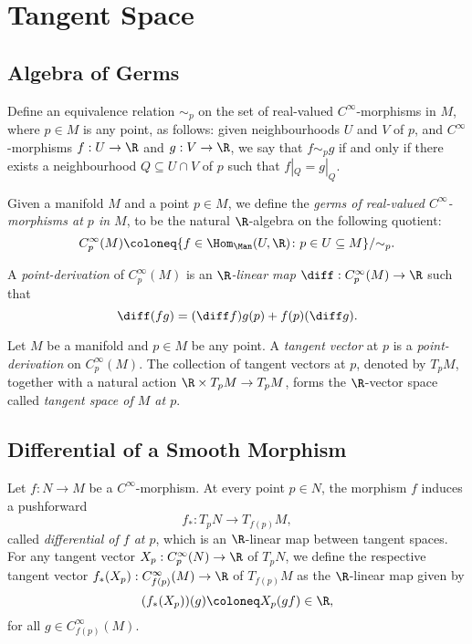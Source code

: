 \section{Tangent Space}

\subsection{Algebra of Germs}

Define an equivalence relation \(\sim_p\) on the set of real-valued
\(C^{\infty}\)-morphisms in \(M\), where \(p \in M\) is any point, as follows:
given neighbourhoods \(U\) and \(V\) of \(p\), and \(C^{\infty}\)-morphisms
\(f: U \to \R\) and \(g: V \to \R\), we say that \(f \sim_p g\) if and only if
there exists a neighbourhood \(Q \subseteq U \cap V\) of \(p\) such that
\(f|_Q = g|_Q\).

\begin{definition}
\label{def:algebra-of-germs-manifold}
Given a manifold \(M\) and a point \(p \in M\), we define the \emph{germs of
  real-valued \(C^{\infty}\)-morphisms at \(p\) in \(M\)}, to be the natural
\(\R\)-algebra on the following quotient:
\[
C_p^{\infty}(M) \coloneq
\{f \in \Hom_{\Man}(U, \R) \colon p \in U \subseteq M\}/{\sim_p}.
\]

A \emph{point-derivation} of \(C_p^{\infty}(M)\) is an \emph{\(\R\)-linear map}
\(\diff: C_p^{\infty}(M) \to \R\) such that
\[
\diff(f g) = (\diff f) g(p) + f(p) (\diff g).
\]
\end{definition}

\begin{definition}
\label{def:tangent-vector-at-point-manifold}
Let \(M\) be a manifold and \(p \in M\) be any point. A \emph{tangent vector} at
\(p\) is a \emph{point-derivation} on \(C_p^{\infty}(M)\). The collection of
tangent vectors at \(p\), denoted by \(T_p M\), together with a natural action
\(\R \times T_p M \to T_p M\), forms the \(\R\)-vector space called
\emph{tangent space of \(M\) at \(p\)}.
\end{definition}

\subsection{Differential of a Smooth Morphism}

\begin{definition}
\label{def:}
Let \(f: N \to M\) be a \(C^{\infty}\)-morphism. At every point \(p \in N\), the
morphism \(f\) induces a pushforward
\[
f_{*}: T_p N \longrightarrow T_{f(p)} M,
\]
called \emph{differential of \(f\) at \(p\)}, which is an \(\R\)-linear map
between tangent spaces. For any tangent vector \(X_p: C_p^{\infty}(N) \to \R\) of
\(T_p N\), we define the respective tangent vector
\(f_{*}(X_p): C_{f(p)}^{\infty}(M) \to \R\) of \(T_{f(p)} M\) as the
\(\R\)-linear map given by
\[
(f_{*}(X_p))(g) \coloneq X_p(g f) \in \R,
\]
for all \(g \in C_{f(p)}^{\infty}(M)\).
\end{definition}

